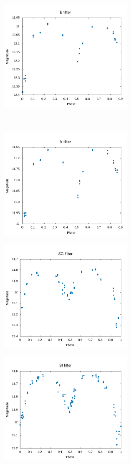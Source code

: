 \documentclass[linenumbers]{aastex631}
\begin{document}
\begin{figure}[H]
  \centering
  \begin{subfigure}{}
    \includegraphics[width=2.5in]{Figures/B.png}
  \end{subfigure} \\
  \begin{subfigure}{}
    \includegraphics[width=2.5in]{Figures/V.png}
  \end{subfigure}
  \begin{subfigure}{}
    \includegraphics[width=2.5in]{Figures/SG.png}
  \end{subfigure}
  \begin{subfigure}{}
    \includegraphics[width=2.5in]{Figures/SI.png}

\end{subfigure}
\end{figure}
\end{document}
